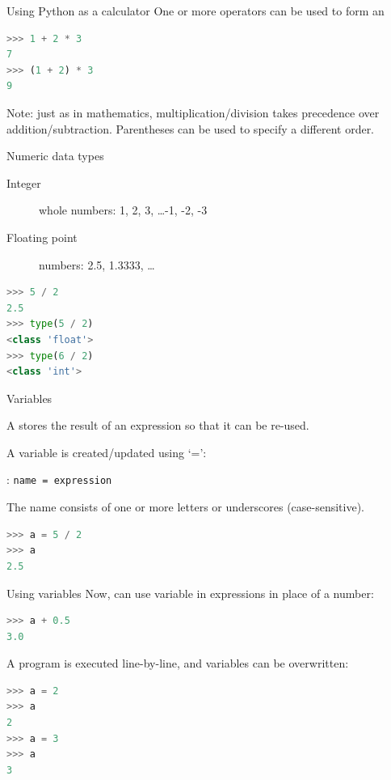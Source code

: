 \documentclass[aspectratio=169,usenames,dvipsnames]{beamer}
\begin{document}
\begin{frame}[fragile]{Using Python as a calculator}
One or more operators can be used to form an 
\begin{lstlisting}[language=python]
>>> 1 + 2 * 3
7
>>> (1 + 2) * 3
9
\end{lstlisting}

\pause
Note: just as in mathematics, multiplication/division takes precedence over
    addition/subtraction. Parentheses can be used to specify a different order.
\end{frame}

\begin{frame}[fragile]{Numeric data types}
    \begin{description}
        \item[Integer] whole numbers: 1, 2, 3, \dots -1, -2, -3
        \item[Floating point] numbers: 2.5, 1.3333, \dots
    \end{description}

\pause
\begin{lstlisting}[language=python]
>>> 5 / 2
2.5
>>> type(5 / 2)
<class 'float'>
>>> type(6 / 2)
<class 'int'>
\end{lstlisting}
\end{frame}

\begin{frame}[fragile]{Variables}
    \begin{definition}
        A  stores the result of an expression
        so that it can be re-used.
    \end{definition}

A variable is created/updated using `=':

\begin{definition}
: \texttt{name = expression}

The name consists of one or more letters or underscores (case-sensitive).
\end{definition}

\begin{lstlisting}[language=python]
>>> a = 5 / 2
>>> a
2.5
\end{lstlisting}
\end{frame}

\begin{frame}[fragile]{Using variables}
Now, can use variable in expressions in place of a number:

\begin{lstlisting}[language=python]
>>> a + 0.5
3.0
\end{lstlisting}

\pause
A program is executed line-by-line, and variables can be overwritten:
\begin{lstlisting}[language=python]
>>> a = 2
>>> a
2
>>> a = 3
>>> a
3
\end{lstlisting}
\end{frame}
\end{document}

